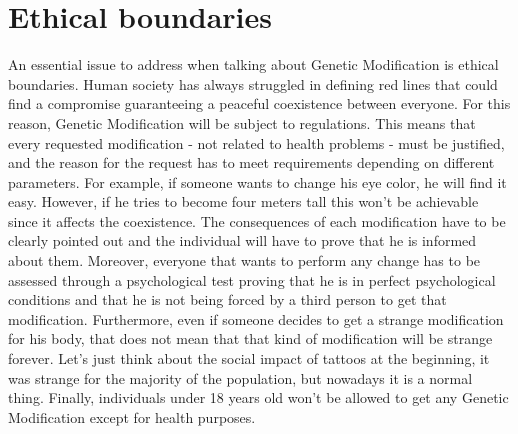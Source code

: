 \section*{Ethical boundaries}
\label{sec:ethics}
An essential issue to address when talking about Genetic Modification is ethical boundaries. Human society has always struggled in defining red lines that could find a compromise guaranteeing a peaceful coexistence between everyone. For this reason, Genetic Modification will be subject to regulations. This means that every requested modification - not related to health problems - must be justified, and the reason for the request has to meet requirements depending on different parameters. For example, if someone wants to change his eye color, he will find it easy. However, if he tries to become four meters tall this won’t be achievable since it affects the coexistence. The consequences of each modification have to be clearly pointed out and the individual will have to prove that he is informed about them. Moreover, everyone that wants to perform any change has to be assessed through a psychological test proving that he is in perfect psychological conditions and that he is not being forced by a third person to get that modification. Furthermore, even if someone decides to get a strange modification for his body, that does not mean that that kind of modification will be strange forever. Let’s just think about the social impact of tattoos at the beginning, it was strange for the majority of the population, but nowadays it is a normal thing. Finally, individuals under 18 years old won’t be allowed to get any Genetic Modification except for health purposes. 


